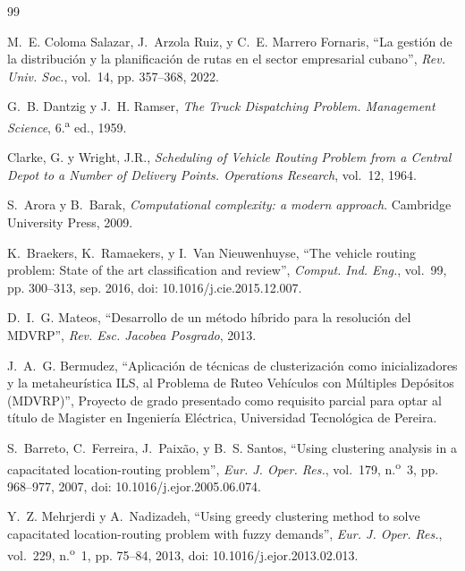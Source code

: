 \begin{thebibliography}{99}

 M.~E. Coloma Salazar, J.~Arzola Ruiz, y C.~E. Marrero Fornaris, ``La gesti\'on de la distribuci\'on y la planificaci\'on de rutas en el sector empresarial cubano'', \emph{Rev. Univ. Soc.}, vol.~14, pp. 357--368, 2022.

 G.~B. Dantzig y J.~H. Ramser, \emph{The Truck Dispatching Problem. Management Science}, 6.\textsuperscript{a} ed., 1959.

 Clarke, G. y Wright, J.R., \emph{Scheduling of Vehicle Routing Problem from a Central Depot to a Number of Delivery Points. Operations Research}, vol.~12, 1964.

 S.~Arora y B.~Barak, \emph{Computational complexity: a modern approach}. Cambridge University Press, 2009.

 K.~Braekers, K.~Ramaekers, y I.~Van Nieuwenhuyse, ``The vehicle routing problem: State of the art classification and review'', \emph{Comput. Ind. Eng.}, vol.~99, pp. 300--313, sep. 2016, doi: 10.1016/j.cie.2015.12.007.

 D.~I.~G. Mateos, ``Desarrollo de un m\'etodo h\'ibrido para la resoluci\'on del MDVRP'', \emph{Rev. Esc. Jacobea Posgrado}, 2013.

 J.~A.~G. Bermudez, ``Aplicaci\'on de t\'ecnicas de clusterizaci\'on como inicializadores y la metaheur\'istica ILS, al Problema de Ruteo Veh\'iculos con M\'ultiples Dep\'ositos (MDVRP)'', Proyecto de grado presentado como requisito parcial para optar al t\'itulo de Magister en Ingenier\'ia El\'ectrica, Universidad Tecnol\'ogica de Pereira.

 S.~Barreto, C.~Ferreira, J.~Paix\~ao, y B.~S. Santos, ``Using clustering analysis in a capacitated location-routing problem'', \emph{Eur. J. Oper. Res.}, vol.~179, n.\textsuperscript{o}~3, pp. 968--977, 2007, doi: 10.1016/j.ejor.2005.06.074.

 Y.~Z. Mehrjerdi y A.~Nadizadeh, ``Using greedy clustering method to solve capacitated location-routing problem with fuzzy demands'', \emph{Eur. J. Oper. Res.}, vol.~229, n.\textsuperscript{o}~1, pp. 75--84, 2013, doi: 10.1016/j.ejor.2013.02.013.


\end{thebibliography}
